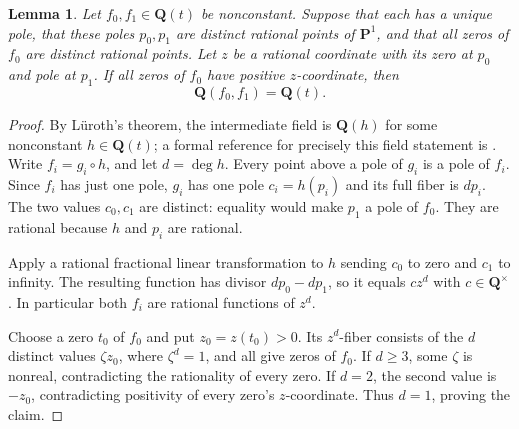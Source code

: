 \documentclass[11pt,a4paper]{article}
\newcommand{\Q}{\mathbf Q}
\newcommand{\Pp}{\mathbf P}
\newtheorem{lemma}[theorem]{Lemma}
\begin{document}
\begin{lemma}\label{lem:two-poles}
Let $f_0,f_1\in\Q(t)$ be nonconstant. Suppose that each has a
unique pole, that these poles $p_0,p_1$ are distinct rational points
of $\Pp^1$, and that all zeros of $f_0$ are distinct rational points.
Let $z$ be a rational coordinate with its zero at $p_0$ and pole at
$p_1$. If all zeros of $f_0$ have positive $z$-coordinate, then
\[
                         \Q(f_0,f_1)=\Q(t).
\]
\end{lemma}
\begin{proof}
By L\"uroth's theorem, the intermediate field is $\Q(h)$ for
some nonconstant $h\in\Q(t)$; a formal reference for precisely
this field statement is \cite{Luroth}. Write $f_i=g_i\circ h$,
and let $d=\deg h$.
Every point above a pole of $g_i$ is a pole of $f_i$. Since $f_i$
has just one pole, $g_i$ has one pole $c_i=h(p_i)$ and its full
fiber is $d p_i$. The two values $c_0,c_1$ are distinct: equality
would make $p_1$ a pole of $f_0$. They are rational because $h$
and $p_i$ are rational.

Apply a rational fractional linear transformation to $h$ sending
$c_0$ to zero and $c_1$ to infinity. The resulting function has
divisor $d p_0-d p_1$, so it equals $c z^d$ with
$c\in\Q^\times$. In particular both $f_i$ are rational
functions of $z^d$.

Choose a zero $t_0$ of $f_0$ and put $z_0=z(t_0)>0$.
Its $z^d$-fiber consists of the $d$ distinct values
$\zeta z_0$, where $\zeta^d=1$, and all give zeros of $f_0$.
If $d\ge3$, some $\zeta$ is nonreal, contradicting the
rationality of every zero. If $d=2$, the second value is $-z_0$,
contradicting positivity of every zero's $z$-coordinate. Thus
$d=1$, proving the claim.
\end{proof}
\end{document}
